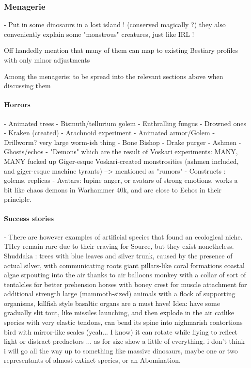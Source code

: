 \subsubsection{Menagerie}


- Put in some dinosaurs in a lost island ! (conserved magically ?) they also conveniently explain some "monstrous" creatures, just like IRL !

Off handedly mention that many of them can map to existing Bestiary profiles with only minor adjustments


Among the menagerie: to be spread into the relevant sections above when discussing them


\paragraph{Horrors}

- Animated trees
- Bismuth/tellurium golem
- Enthralling fungus
- Drowned ones
- Kraken (created)
- Arachnoid experiment
- Animated armor/Golem
- Drillworm? very large worm-ish thing
- Bone Bishop
- Drake purger
- Ashmen
 - Ghosts/echos
- "Demons" which are the result of Voskari experiments:	MANY, MANY fucked up Giger-esque Voskari-created monstrosities (ashmen included, and giger-esque machine tyrants) –> mentioned as "rumors"
- Constructs : golems, replicas
- Avatars: lupine anger, or avatars of strong emotions, works a bit like chaos demons in Warhammer 40k, and are close to Echos in their principle.

\paragraph{Success stories}



- There are however examples of artificial species that found an ecological niche. THey remain rare due to their craving for Source, but they exist nonetheless. 
	Shuddaka : trees with blue leaves and silver trunk, caused by the presence of actual silver, with communicating roots
	giant pillars-like coral formations
	coastal algae srpouting into the air thanks to air balloons
	monkey with a collar of sort of tentalcles for better prehension
	horses with boney crest for muscle attachment for additional strength
	large (mammoth-sized) animals with a flock of supporting organisms, killfish style
	basaltic organs are a must have! Idea: have some gradually slit tout, like missiles launching, and then explode in the air
	catlike species with very elastic tendons, can bend its spine into nighmarish contortions
	bird with mirror-like scales (yeah... I know) it can rotate while flying to reflect light or distract predactors
... as for size show a little of everything. i don't think i will go all the way up to something like massive dinosaurs, maybe one or two representants of almost extinct species, or an Abomination.




















